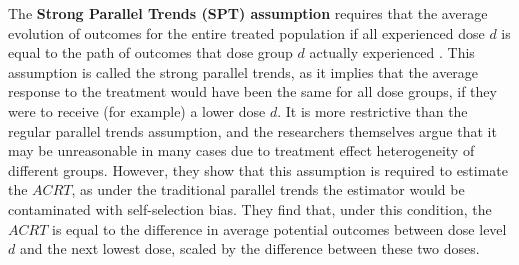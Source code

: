 \documentclass[12pt]{article}
\begin{document}
The \textbf{Strong Parallel Trends (SPT) assumption} requires that the average evolution of  outcomes for the entire treated population if all experienced dose $d$ is equal to the path of outcomes that dose group $d$ actually experienced \parencite{callawayDifferenceinDifferencesContinuousTreatment2025}. This assumption is called the strong parallel trends, as it implies that the average response to the treatment would have been the same for all dose groups, if they were to receive (for example) a lower dose $d$. It is more restrictive than the regular parallel trends assumption, and the researchers themselves argue that it may be unreasonable in many cases due to treatment effect heterogeneity of different groups. However, they show that this assumption is required to estimate the $ACRT$, as under the traditional parallel trends the estimator would be contaminated with self-selection bias. They find that, under this condition, the $ACRT$ is equal to the difference in average potential outcomes between dose level $d$ and the next lowest dose, scaled by the difference between these two doses. 
\end{document}
